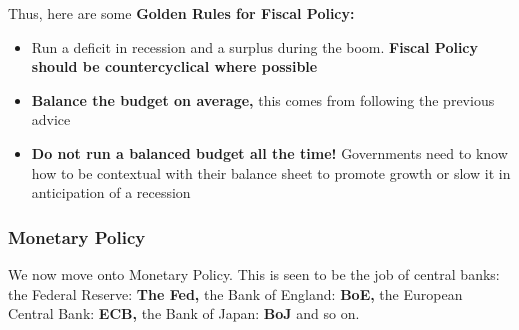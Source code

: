 \documentclass[12pt, letterpaper]{article}
\begin{document}
Thus, here are some \textbf{Golden Rules for Fiscal Policy:}
\begin{itemize}
	\item Run a deficit in recession and a surplus during the boom. \textbf{Fiscal Policy should be countercyclical where possible}
	\item \textbf{Balance the budget on average,} this comes from following the previous advice
	\item \textbf{Do not run a balanced budget all the time!} Governments need to know how to be contextual with their balance sheet to promote growth or slow it in anticipation of a recession
\end{itemize}

\subsubsection{Monetary Policy}
We now move onto Monetary Policy. This is seen to be the job of central banks: the Federal Reserve: \textbf{The Fed,} the Bank of England: \textbf{BoE,} the European Central Bank: \textbf{ECB,} the Bank of Japan: \textbf{BoJ} and so on.
\end{document}
